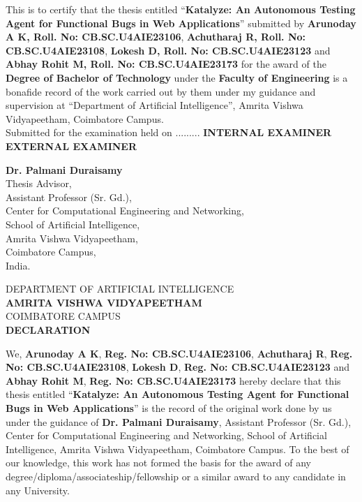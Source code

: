 \documentclass[a4paper, 12pt]{report}
\theoremstyle{definition}
\begin{document}
	\vspace*{.8cm}
	\noindent This is to certify that the thesis entitled \enquote{\textbf{Katalyze: An Autonomous Testing Agent for Functional Bugs in Web Applications}} submitted by \textbf{Arunoday A K, Roll. No: CB.SC.U4AIE23106}, \textbf{Achutharaj R, Roll. No: CB.SC.U4AIE23108}, \textbf{Lokesh D, Roll. No: CB.SC.U4AIE23123} and \textbf{Abhay Rohit M, Roll. No: CB.SC.U4AIE23173} for the award of the \textbf{Degree of Bachelor of Technology} under the \textbf{Faculty of Engineering} is a bonafide record of the work carried out by them under my guidance and supervision at \enquote{Department of Artificial Intelligence}, Amrita Vishwa Vidyapeetham, Coimbatore Campus.\\
    \vfill
    Submitted for the examination held on .........
    \vfill
    \textbf{INTERNAL EXAMINER}    \hspace{5cm}      \textbf{EXTERNAL EXAMINER}
    \vfill
\begin{center}
		\textbf{Dr. Palmani Duraisamy}\\
	Thesis Advisor,\\
	Assistant Professor (Sr. Gd.),\\
	Center for Computational Engineering and Networking,\\
	School of Artificial Intelligence,\\
	Amrita Vishwa Vidyapeetham,\\
	Coimbatore Campus,\\
	India.
\end{center}

	\newpage
	\begin{center}
	{\large DEPARTMENT OF ARTIFICIAL INTELLIGENCE}\\
	\Large{ \textbf{AMRITA VISHWA VIDYAPEETHAM}}\\

	{\large COIMBATORE CAMPUS}\\


		\vspace*{2.5cm}
		\large {\textbf{DECLARATION}}
		\vspace*{.3cm}
	\end{center}

	\noindent We,\textbf{ Arunoday A K},  \textbf{Reg. No: CB.SC.U4AIE23106}, \textbf{ Achutharaj R},  \textbf{Reg. No: CB.SC.U4AIE23108}, \textbf{ Lokesh D},  \textbf{Reg. No: CB.SC.U4AIE23123} and \textbf{ Abhay Rohit M},  \textbf{Reg. No: CB.SC.U4AIE23173} hereby declare that this thesis entitled \enquote{\textbf{Katalyze: An Autonomous Testing Agent for Functional Bugs in Web Applications}} is the record of the original work done by us under the guidance of \textbf{Dr. Palmani Duraisamy}, Assistant Professor (Sr. Gd.), Center for Computational Engineering and Networking, School of Artificial Intelligence, Amrita Vishwa Vidyapeetham, Coimbatore Campus. To the best of our knowledge, this work has not formed the basis for the award of any degree/diploma/associateship/fellowship or a similar award to any candidate in any University.\\\\
\end{document}
